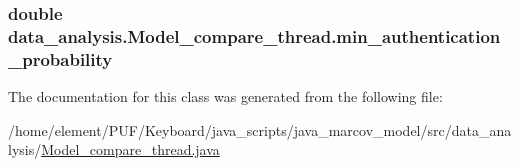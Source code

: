 \subsubsection[{\texorpdfstring{min\+\_\+authentication\+\_\+probability}{min_authentication_probability}}]{\setlength{\rightskip}{0pt plus 5cm}double data\+\_\+analysis.\+Model\+\_\+compare\+\_\+thread.\+min\+\_\+authentication\+\_\+probability}\hypertarget{classdata__analysis_1_1_model__compare__thread_a8a9c58abe260de662f846876d4f7fed2}{}\label{classdata__analysis_1_1_model__compare__thread_a8a9c58abe260de662f846876d4f7fed2}


The documentation for this class was generated from the following file\+:\begin{DoxyCompactItemize}
\item 
/home/element/\+P\+U\+F/\+Keyboard/java\+\_\+scripts/java\+\_\+marcov\+\_\+model/src/data\+\_\+analysis/\hyperlink{_model__compare__thread_8java}{Model\+\_\+compare\+\_\+thread.\+java}\end{DoxyCompactItemize}
